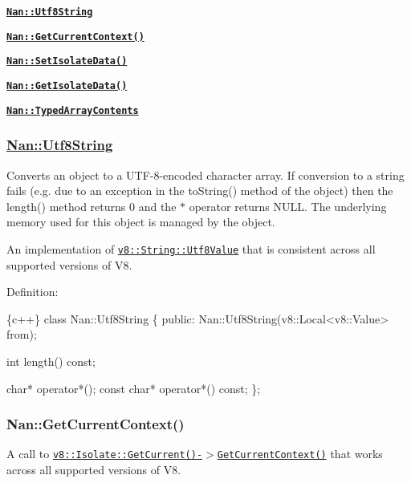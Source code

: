 
\begin{DoxyItemize}
\item \href{#api_nan_utf8_string}{\tt {\bfseries {\ttfamily Nan\+::\+Utf8\+String}}}
\item \href{#api_nan_get_current_context}{\tt {\bfseries {\ttfamily Nan\+::\+Get\+Current\+Context()}}}
\item \href{#api_nan_set_isolate_data}{\tt {\bfseries {\ttfamily Nan\+::\+Set\+Isolate\+Data()}}}
\item \href{#api_nan_get_isolate_data}{\tt {\bfseries {\ttfamily Nan\+::\+Get\+Isolate\+Data()}}}
\item \href{#api_nan_typedarray_contents}{\tt {\bfseries {\ttfamily Nan\+::\+Typed\+Array\+Contents}}}
\end{DoxyItemize}

\label{_api_nan_utf8_string}%
 \subsubsection*{\hyperlink{class_nan_1_1_utf8_string}{Nan\+::\+Utf8\+String}}

Converts an object to a U\+T\+F-\/8-\/encoded character array. If conversion to a string fails (e.\+g. due to an exception in the to\+String() method of the object) then the length() method returns 0 and the $\ast$ operator returns N\+U\+LL. The underlying memory used for this object is managed by the object.

An implementation of \href{https://v8docs.nodesource.com/io.js-3.0/d4/d1b/classv8_1_1_string_1_1_utf8_value.html}{\tt {\ttfamily v8\+::\+String\+::\+Utf8\+Value}} that is consistent across all supported versions of V8.

Definition\+:


\begin{DoxyCode}
\{c++\}
class Nan::Utf8String \{
 public:
  Nan::Utf8String(v8::Local<v8::Value> from);

  int length() const;

  char* operator*();
  const char* operator*() const;
\};
\end{DoxyCode}


\label{_api_nan_get_current_context}%
 \subsubsection*{Nan\+::\+Get\+Current\+Context()}

A call to \href{https://v8docs.nodesource.com/io.js-3.0/d5/dda/classv8_1_1_isolate.html#a81c7a1ed7001ae2a65e89107f75fd053}{\tt {\ttfamily v8\+::\+Isolate\+::\+Get\+Current()-\/$>$Get\+Current\+Context()}} that works across all supported versions of V8.

